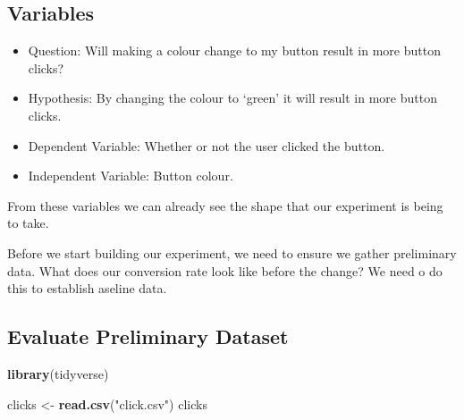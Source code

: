 \documentclass[]{article}
\newenvironment{Shaded}{\begin{snugshade}}{\end{snugshade}}
\newcommand{\KeywordTok}[1]{\textcolor[rgb]{0.13,0.29,0.53}{\textbf{#1}}}
\newcommand{\StringTok}[1]{\textcolor[rgb]{0.31,0.60,0.02}{#1}}
\newcommand{\NormalTok}[1]{#1}
\providecommand{\tightlist}{%
  \setlength{\itemsep}{0pt}\setlength{\parskip}{0pt}}
\begin{document}
\subsection{Variables}\label{variables-1}

\begin{itemize}
\tightlist
\item
  Question: Will making a colour change to my button result in more
  button clicks?
\item
  Hypothesis: By changing the colour to `green' it will result in more
  button clicks.
\item
  Dependent Variable: Whether or not the user clicked the button.
\item
  Independent Variable: Button colour.
\end{itemize}

From these variables we can already see the shape that our experiment is
being to take.

Before we start building our experiment, we need to ensure we gather
preliminary data. What does our conversion rate look like before the
change? We need o do this to establish aseline data.

\subsection{Evaluate Preliminary
Dataset}\label{evaluate-preliminary-dataset}

\begin{Shaded}
\begin{Highlighting}[]
\KeywordTok{library}\NormalTok{(tidyverse)}

\NormalTok{clicks <-}\StringTok{ }\KeywordTok{read.csv}\NormalTok{(}\StringTok{"click.csv"}\NormalTok{)}
\NormalTok{clicks}
\end{Highlighting}
\end{Shaded}
\end{document}
